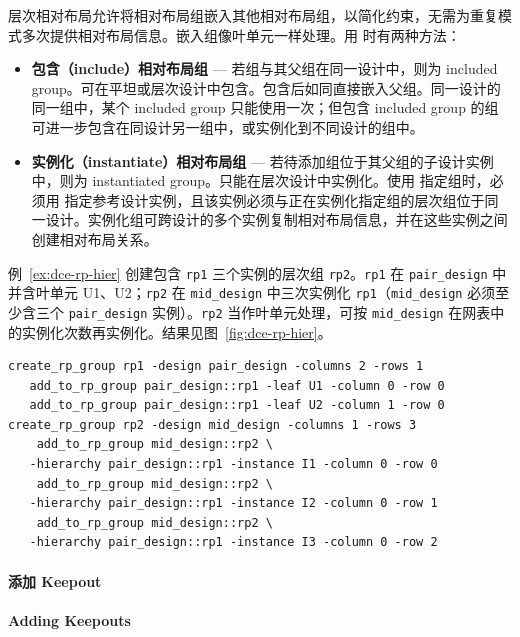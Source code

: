层次相对布局允许将相对布局组嵌入其他相对布局组，以简化约束，无需为重复模式多次提供相对布局信息。嵌入组像叶单元一样处理。用  时有两种方法：
\begin{itemize}
  \item \textbf{包含（include）相对布局组} — 若组与其父组在同一设计中，则为 included group。可在平坦或层次设计中包含。包含后如同直接嵌入父组。同一设计的同一组中，某个 included group 只能使用一次；但包含 included group 的组可进一步包含在同设计另一组中，或实例化到不同设计的组中。
  \item \textbf{实例化（instantiate）相对布局组} — 若待添加组位于其父组的子设计实例中，则为 instantiated group。只能在层次设计中实例化。使用  指定组时，必须用  指定参考设计实例，且该实例必须与正在实例化指定组的层次组位于同一设计。实例化组可跨设计的多个实例复制相对布局信息，并在这些实例之间创建相对布局关系。
\end{itemize}

例~\ref{ex:dce-rp-hier} 创建包含 \texttt{rp1} 三个实例的层次组 \texttt{rp2}。\texttt{rp1} 在 \texttt{pair\_design} 中并含叶单元 U1、U2；\texttt{rp2} 在 \texttt{mid\_design} 中三次实例化 \texttt{rp1}（\texttt{mid\_design} 必须至少含三个 \texttt{pair\_design} 实例）。\texttt{rp2} 当作叶单元处理，可按 \texttt{mid\_design} 在网表中的实例化次数再实例化。结果见图~\ref{fig:dce-rp-hier}。

\begin{lstlisting}[caption={在层次组中实例化组},label={ex:dce-rp-hier}]
create_rp_group rp1 -design pair_design -columns 2 -rows 1
   add_to_rp_group pair_design::rp1 -leaf U1 -column 0 -row 0
   add_to_rp_group pair_design::rp1 -leaf U2 -column 1 -row 0
create_rp_group rp2 -design mid_design -columns 1 -rows 3
    add_to_rp_group mid_design::rp2 \
   -hierarchy pair_design::rp1 -instance I1 -column 0 -row 0
    add_to_rp_group mid_design::rp2 \
   -hierarchy pair_design::rp1 -instance I2 -column 0 -row 1
    add_to_rp_group mid_design::rp2 \
   -hierarchy pair_design::rp1 -instance I3 -column 0 -row 2
\end{lstlisting}


\paragraph{添加 Keepout}
\paragraph*{Adding Keepouts}

